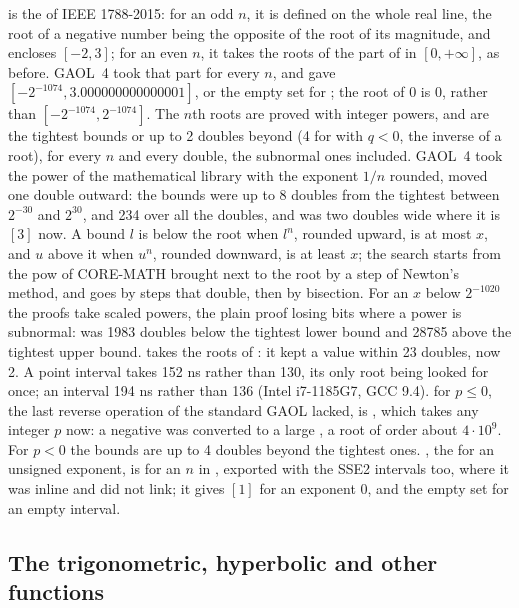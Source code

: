 \medskip
{} is the  of IEEE 1788-2015: for an odd
$n$, it is defined on the whole real line, the root of a negative number
being the opposite of the root of its magnitude, and  encloses $[-2, 3]$; for an even $n$, it takes the roots of the part of
 in $[0, +\infty]$, as before.\newinvfive{} GAOL~4 took that part for
every $n$, and gave $[-2^{-1074}, 3.000000000000001]$, or the empty set for
; the root of 0 is 0, rather than
$[-2^{-1074}, 2^{-1074}]$. The $n$th roots are proved with integer powers,
and are the tightest bounds or up to 2 doubles beyond (4 for 
with $q < 0$, the inverse of a root), for every $n$ and every double, the
subnormal ones included. GAOL~4 took the power of the mathematical library
with the exponent $1/n$ rounded, moved one double outward: the bounds were up
to 8 doubles from the tightest between $2^{-30}$ and $2^{30}$, and 234 over
all the doubles, and  was two doubles wide where it
is $[3]$ now. A bound $l$ is below the root when $l^n$, rounded upward, is at
most $x$, and $u$ above it when $u^n$, rounded downward, is at least $x$; the
search starts from the pow of CORE-MATH brought next to the root by a step of
Newton's method, and goes by steps that double, then by bisection. For an
$x$ below $2^{-1020}$ the proofs take scaled powers, the plain proof losing
bits where a power is subnormal:  was 1983
doubles below the tightest lower bound and 28785 above the tightest upper
bound.  takes the roots of : it kept
a value within 23 doubles, now 2. A point interval takes 152 ns rather than
130, its only root being looked for once; an interval 194 ns rather than 136
(Intel i7-1185G7, GCC 9.4).  for $p \leq 0$, the last
reverse operation of the standard GAOL lacked, is , which takes any integer $p$ now: a negative  was converted to
a large , a root of order about $4 \cdot 10^9$. For
$p < 0$ the bounds are up to 4 doubles beyond the tightest ones.
, the  for an unsigned exponent, is  for an  $n$ in , exported with the SSE2
intervals too, where it was inline and did not link; it gives $[1]$ for an
exponent 0, and the empty set for an empty interval.

\subsection{The trigonometric, hyperbolic and other functions}
\label{sec:changes-functions}
%


